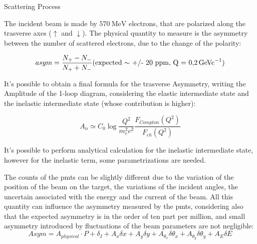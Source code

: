 \documentclass[8pt,a4paper]{beamer}
\begin{document}
\begin{frame}{Scattering Process}

The incident beam is made by $\SI{570}{\mega \electronvolt}$ electrons, that are polarized along the trasverse axes ($\uparrow$ and $\downarrow$). The physical quantity to measure is the asymmetry between the number of scattered electrons, due to the change of the polarity:

\begin{equation}
asym = \frac{N_{+} - N_{-}}{N_{+} + N_{-}} \text{(expected $\sim$ +/- 20 ppm, Q = \SI{0.2}{\giga\electronvolt c^{-1}})}
\end{equation}

It's possible to obtain a final formula for the trasverse Asymmetry, writing the Amplitude of the 1-loop diagram, considering the elastic intermediate state and the inelastic intermediate state (whose contribution is higher):

\begin{equation}
A_{n} \simeq C_{0} \log \frac{Q^{2}}{m^2_e c^2} \frac{F_{Compton} (Q^2)}{F_{ch}(Q^2)}
\end{equation}

It's possible to perform analytical calculation for the inelastic intermediate state, however for the inelastic term, some parametrizations are needed.

\end{frame}

\begin{frame}
The counts of the pmts can be slightly different due to the variation of the position of the beam on the target, the variations of the incident angles, the uncertain associated with the energy and the current of the beam. All this quantity can influence the asymmetry measured by the pmts, considering also that the expected asymmetry is in the order of ten part per million, and small asymmetry introduced by fluctuations of the beam parameters are not negligible:
\newline
\newline
\begin{equation}
Asym = A_{physical} \cdot P + \delta_{I} + A_{x} \delta x + A_{y} \delta y + A_{\theta_{x}} \delta \theta_{x} + A_{\theta_{y}} \delta \theta_{y}+ A_{E} \delta E 
\end{equation}
\end{frame}
\end{document}
